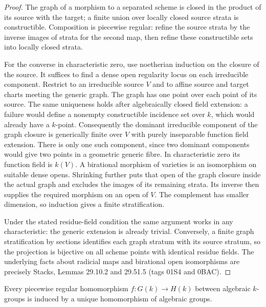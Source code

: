 \begin{proof}
The graph of a morphism to a separated scheme is closed in the product of
its source with the target; a finite union over locally closed source
strata is constructible.  Composition is piecewise regular: refine the
source strata by the inverse images of strata for the second map, then
refine these constructible sets into locally closed strata.

For the converse in characteristic zero, use noetherian induction on the
closure of the source.  It suffices to find a dense open regularity locus
on each irreducible component.  Restrict to an irreducible source $V$ and
to affine source and target charts meeting the generic graph.  The graph
has one point over each point of its source.  The same uniqueness holds
after algebraically closed field extension: a failure would define a
nonempty constructible incidence set over $k$, which would already have a
$k$-point.  Consequently the dominant irreducible component of the graph
closure is generically finite over $V$ with purely inseparable function
field extension.  There is only one such component, since two dominant
components would give two points in a geometric generic fibre.  In
characteristic zero its function field is $k(V)$.  A birational morphism
of varieties is an isomorphism on suitable dense opens.  Shrinking further
puts that open of the graph closure inside the actual graph and excludes
the images of its remaining strata.  Its inverse then supplies the
required morphism on an open of $V$.  The complement has smaller dimension,
so induction gives a finite stratification.

Under the stated residue-field condition the same argument works in any
characteristic: the generic extension is already trivial.  Conversely, a
finite graph stratification by sections identifies each graph stratum
with its source stratum, so the projection is bijective on all scheme
points with identical residue fields.  The underlying facts about
radicial maps and birational open isomorphisms are precisely Stacks,
Lemmas 29.10.2 and 29.51.5 (tags 01S4 and 0BAC)\cite[tags 01S4 and 0BAC]{BStacks}.
\end{proof}

\begin{lemma}\label{C:piecewise-group-fullness}
Every piecewise regular homomorphism $f:G(k)\to H(k)$ between algebraic
$k$-groups is induced by a unique homomorphism of algebraic groups.
\end{lemma}

